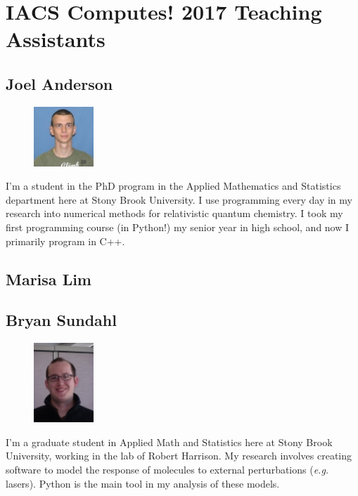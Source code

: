 \documentclass[]{article}
\begin{document}
\section*{IACS Computes! 2017 Teaching Assistants}

\subsection*{Joel Anderson} 
\begin{figure}
\begin{centering}
    \includegraphics[width=0.2\textwidth]{joel.jpg}
\end{centering}
\end{figure}
I'm a student in the PhD program in the Applied Mathematics and Statistics department here at Stony Brook University. I use programming every day in my research into numerical methods for relativistic quantum chemistry. I took my first programming course (in Python!) my senior year in high school, and now I primarily program in C++.

\subsection*{Marisa Lim} 
\begin{figure}
\end{figure}



\subsection*{Bryan Sundahl} 
\begin{figure}
\begin{centering}
    \includegraphics[width=0.2\textwidth]{bryan.jpg}
\end{centering}
\end{figure}
I'm a graduate student in Applied Math and Statistics here at Stony Brook University, working in the lab of Robert Harrison. My research involves creating software to model the response of molecules to external perturbations (\textit{e.g.} lasers).  Python is the main tool in my analysis of these models. 
\end{document}
